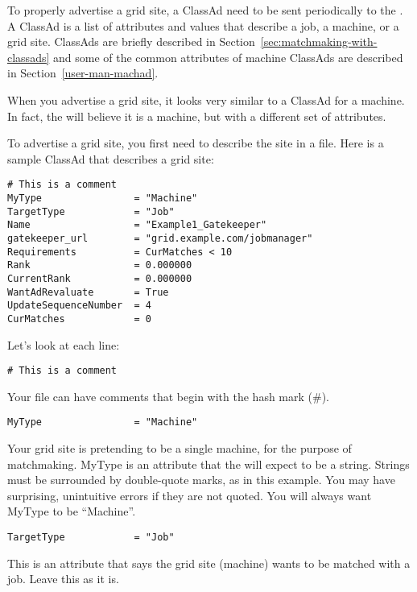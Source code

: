 To properly advertise a grid site, a ClassAd need to be sent
periodically to the . A ClassAd is a list of
attributes and values that describe a job, a machine, or a grid
site. ClassAds are briefly described in
Section~\ref{sec:matchmaking-with-classads} and some of the common
attributes of machine ClassAds are described in
Section~\ref{user-man-machad}.

When you advertise a grid site, it looks very similar to a ClassAd for
a machine. In fact, the  will believe it is a
machine, but with a different set of attributes. 

To advertise a grid site, you first need to describe the site in a
file. Here is a sample ClassAd that describes a grid site:

\footnotesize
\begin{verbatim}
# This is a comment
MyType                = "Machine"
TargetType            = "Job"
Name                  = "Example1_Gatekeeper"
gatekeeper_url        = "grid.example.com/jobmanager"
Requirements          = CurMatches < 10
Rank                  = 0.000000
CurrentRank           = 0.000000
WantAdRevaluate       = True
UpdateSequenceNumber  = 4
CurMatches            = 0
\end{verbatim}
\normalsize

Let's look at each line:

\begin{verbatim}
# This is a comment
\end{verbatim}

Your file can have comments that begin with the hash mark (\#). 

\begin{verbatim}
MyType                = "Machine"
\end{verbatim}

Your grid site is pretending to be a single machine, for the purpose
of matchmaking. MyType is an attribute that the 
will expect to be a string. Strings must be surrounded by double-quote
marks, as in this example. You may have surprising, unintuitive errors
if they are not quoted. You will always want MyType to be
``Machine''. 

\begin{verbatim}
TargetType            = "Job"
\end{verbatim}

This is an attribute that says the grid site (machine) wants to be
matched with a job. Leave this as it is. 


